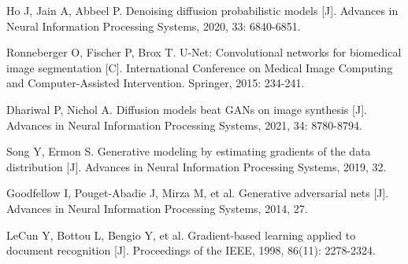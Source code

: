 \begin{references}
  \begin{publications}[itemsep=0.5ex,partopsep=0pt,parsep=0ex,topsep=0bp,labelsep=6pt,listparindent=0pt]
\item Ho J, Jain A, Abbeel P. Denoising diffusion probabilistic models [J]. Advances in Neural Information Processing Systems, 2020, 33: 6840-6851.
\item Ronneberger O, Fischer P, Brox T. U-Net: Convolutional networks for biomedical image segmentation [C]. International Conference on Medical Image Computing and Computer-Assisted Intervention. Springer, 2015: 234-241.
\item Dhariwal P, Nichol A. Diffusion models beat GANs on image synthesis [J]. Advances in Neural Information Processing Systems, 2021, 34: 8780-8794.
\item Song Y, Ermon S. Generative modeling by estimating gradients of the data distribution [J]. Advances in Neural Information Processing Systems, 2019, 32.
\item Goodfellow I, Pouget-Abadie J, Mirza M, et al. Generative adversarial nets [J]. Advances in Neural Information Processing Systems, 2014, 27.
\item LeCun Y, Bottou L, Bengio Y, et al. Gradient-based learning applied to document recognition [J]. Proceedings of the IEEE, 1998, 86(11): 2278-2324.
	\end{publications}
\end{references}


